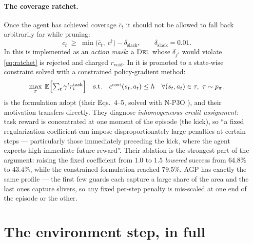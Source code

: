 \documentclass[11pt,a4paper]{article}
\begin{document}
\paragraph{The coverage ratchet.} Once the agent has achieved coverage $\bar{c}_t$ it
should not be allowed to fall back arbitrarily far while pruning:
\begin{equation}\label{eq:ratchet}
  c_t \;\ge\; \min\bigl(\bar{c}_t,\ c^{\dagger}\bigr) - \delta_{\mathrm{slack}},
  \qquad \delta_{\mathrm{slack}} = 0.01 .
\end{equation}
In \stageII{} this is implemented as an \emph{action mask}: a $\textsc{Del}$ whose
$\delta^{-}_{j^\star}$ would violate \eqref{eq:ratchet} is rejected and charged
$r_{\mathrm{void}}$. In \stageIII{} it is promoted to a state-wise constraint solved with a
constrained policy-gradient method:
\begin{equation}\label{eq:statewise}
  \max_\pi\; \Ex\Bigl[\textstyle\sum_t \gamma^t r^{\mathrm{task}}_t\Bigr]
  \quad\text{s.t.}\quad
  c^{\mathrm{cost}}(s_t, a_t) \le h \quad \forall (s_t,a_t) \in \tau,\ \tau \sim p_\pi .
\end{equation}
 is the formulation \citet{xu2025striker} adopt (their Eqs.~4--5, solved
with N-P3O \cite{lee2023constrained}), and their motivation transfers directly. They
diagnose \emph{inhomogeneous credit assignment}: task reward is concentrated at one
moment of the episode (the kick), so ``a fixed regularization coefficient can impose
disproportionately large penalties at certain steps --- particularly those immediately
preceding the kick, where the agent expects high immediate future reward''. Their ablation
is the strongest part of the argument: raising the fixed coefficient from $1.0$ to $1.5$
\emph{lowered} success from $64.8\%$ to $43.4\%$, while the constrained formulation reached
$79.5\%$. AGP has exactly the same profile --- the first few guards each capture a large
share of the area and the last ones capture slivers, so any fixed per-step penalty is
mis-scaled at one end of the episode or the other.

\section{The environment step, in full}
\end{document}
